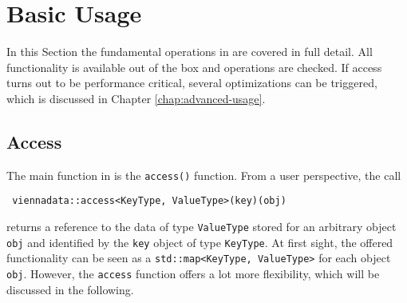 \chapter{Basic Usage} \label{chap:basic-usage}

In this Section the fundamental operations in {\ViennaData} are covered in full detail. 
All functionality is available out of the box and operations are checked. If {\ViennaData} access turns out to be 
performance critical, several optimizations can be triggered, which is discussed in Chapter \ref{chap:advanced-usage}.

\section{Access}
The main function in {\ViennaData} is the \lstinline|access()| function. From a user perspective,
the call
\begin{lstlisting}
 viennadata::access<KeyType, ValueType>(key)(obj) 
\end{lstlisting}
returns a reference to the data of type \lstinline|ValueType| stored for an arbitrary object \lstinline|obj| and identified by the \lstinline|key| object of
type \lstinline|KeyType|. At first sight, the offered functionality can be seen as a \lstinline|std::map<KeyType, ValueType>| for each object \lstinline|obj|.
However, the \lstinline|access| function offers a lot more flexibility, which will be discussed in the following.

